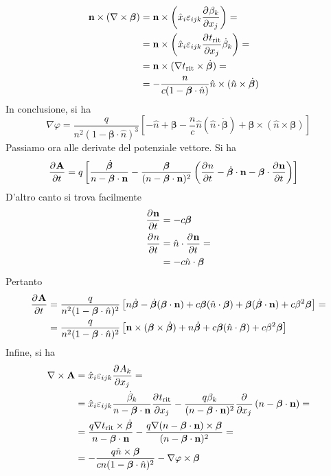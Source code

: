 \documentclass[a4paper,11pt]{article}
\renewcommand{\vec}[1]{\mathbf{#1}}
\renewcommand{\t}{t_{\mathrm{rit}}}
\begin{document}
\begin{align*}
	\\\vec{n}\times(\nabla\times\bm{\beta})&=\vec{n}\times\left(\hat{x}_i\varepsilon_{ijk}\pder{\beta_k}{x_j}\right)=\\&=\vec{n}\times\left(\hat{x}_i\varepsilon_{ijk}\pder{\t}{x_j}\dot{\beta}_k\right)=\\&=\vec{n}\times(\nabla\t\times\dot{\bm{\beta}})=\\&=-\frac{n}{c(1-\bm{\beta}\cdot\hat{n})}\hat{n}\times(\hat{n}\times\dot{\bm{\beta}})
\end{align*}
In conclusione, si ha
\[\nabla\varphi=\frac{q}{n^2(1-\bm{\beta}\cdot\hat{n})^3}\left[-\hat{n}+\bm{\beta}-\frac{n}{c}\hat{n}(\hat{n}\cdot\dot{\bm{\beta}})+\bm{\beta}\times(\hat{n}\times\bm{\beta})\right]\]
Passiamo ora alle derivate del potenziale vettore. Si ha 
\begin{align*}
	\pder{\vec{A}}{t}&=q\left[\frac{\dot{\bm{\beta}}}{n-\bm{\beta}\cdot\vec{n}}-\frac{\bm{\beta}}{(n-\bm{\beta}\cdot\vec{n})^2}\left(\pder{n}{t}-\dot{\bm{\beta}}\cdot\vec{n}-\bm{\beta}\cdot\pder{\vec{n}}{t}\right)\right]
\end{align*}
D'altro canto si trova facilmente
\begin{align*}
	\pder{\vec{n}}{t}&=-c\bm{\beta}\\
	\pder{n}{t}&=\hat{n}\cdot\pder{\vec{n}}{t}=\\&=-c\hat{n}\cdot\bm{\beta}
\end{align*}
Pertanto
\begin{align*}
	\pder{\vec{A}}{t}&=\frac{q}{n^2(1-\bm{\beta}\cdot\hat{n})^2}\left[n\dot{\bm{\beta}}-\dot{\bm{\beta}}(\bm{\beta}\cdot\vec{n})+c\bm{\beta}(\hat{n}\cdot\bm{\beta})+\bm{\beta}(\dot{\bm{\beta}}\cdot\vec{n})+c\beta^2\bm{\beta}\right]=\\&=\frac{q}{n^2(1-\bm{\beta}\cdot\hat{n})^2}\left[\vec{n}\times(\bm{\beta}\times\dot{\bm{\beta}})+n\dot{\bm{\beta}}+c\bm{\beta}(\hat{n}\cdot\bm{\beta})+c\beta^2\bm{\beta}\right]
\end{align*}
Infine, si ha
\begin{align*}
	\nabla\times\vec{A}&=\hat{x}_i\varepsilon_{ijk}\pder{A_k}{x_j}=\\&=\hat{x}_i\varepsilon_{ijk}\frac{\dot{\beta}_k}{n-\bm{\beta}\cdot\vec{n}}\pder{\t}{x_j}-\frac{q\beta_k}{(n-\bm{\beta}\cdot\vec{n})^2}\pder{}{x_j}\left(n-\bm{\beta}\cdot\vec{n}\right)=\\&=\frac{q\nabla\t\times\dot{\bm{\beta}}}{n-\bm{\beta}\cdot\vec{n}}-\frac{q\nabla(n-\bm{\beta}\cdot\vec{n})\times\bm{\beta}}{(n-\bm{\beta}\cdot\vec{n})^2}=\\&=-\frac{q\hat{n}\times\bm{\beta}}{cn(1-\bm{\beta}\cdot\hat{n})^2}-\nabla\varphi\times\bm{\beta}
\end{align*}
\end{document}
